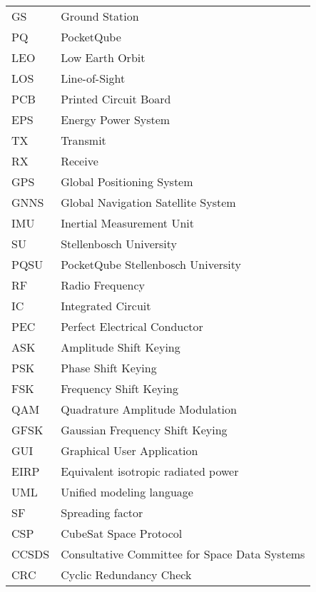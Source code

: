 \begingroup
\renewcommand{\arraystretch}{1.2}
\begin{tabular}{@{}p{2.5cm} l}
    GS      & Ground Station \\
    PQ      & PocketQube \\
    LEO     & Low Earth Orbit \\
    LOS     & Line-of-Sight \\
    PCB     & Printed Circuit Board \\
    EPS     & Energy Power System \\
    TX      & Transmit \\
    RX      & Receive \\
    GPS     & Global Positioning System \\
    GNNS    & Global Navigation Satellite System \\ 
    IMU     & Inertial Measurement Unit \\
    SU      & Stellenbosch University \\
    PQSU    & PocketQube Stellenbosch University \\
    RF      & Radio Frequency \\
    IC      & Integrated Circuit \\
    PEC     & Perfect Electrical Conductor \\
    ASK     & Amplitude Shift Keying \\
    PSK     & Phase Shift Keying \\
    FSK     & Frequency Shift Keying \\
    QAM     & Quadrature Amplitude Modulation \\
    GFSK    & Gaussian Frequency Shift Keying \\
    GUI     & Graphical User Application \\
    EIRP    & Equivalent isotropic radiated power \\
    UML     & Unified modeling language \\
    SF      & Spreading factor \\
    CSP     & CubeSat Space Protocol \\
    CCSDS   & Consultative Committee for Space Data Systems \\
    CRC     & Cyclic Redundancy Check \\
\end{tabular}
\endgroup
